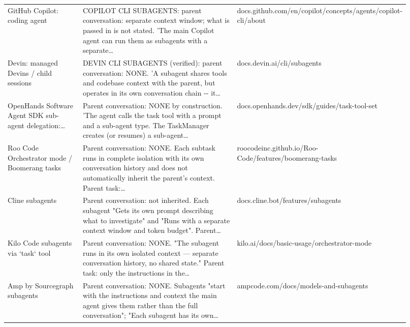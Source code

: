 \begin{longtable}{p{0.22\linewidth}p{0.5\linewidth}p{0.2\linewidth}}
GitHub Copilot: coding agent & COPILOT CLI SUBAGENTS: parent conversation: separate context window; what is passed in is not stated.\allowbreak{} 'The main Copilot agent can run them as subagents with a separate\ldots & docs.\allowbreak{}github.\allowbreak{}com/\allowbreak{}en/\allowbreak{}copilot/\allowbreak{}concepts/\allowbreak{}agents/\allowbreak{}copilot-\allowbreak{}cli/\allowbreak{}about \\
Devin: managed Devins /\allowbreak{} child sessions & DEVIN CLI SUBAGENTS (verified): parent conversation: NONE.\allowbreak{} 'A subagent shares tools and codebase context with the parent, but operates in its own conversation chain -\allowbreak{}-\allowbreak{} it\ldots & docs.\allowbreak{}devin.\allowbreak{}ai/\allowbreak{}cli/\allowbreak{}subagents \\
OpenHands Software Agent SDK sub-\allowbreak{}agent delegation:\ldots & Parent conversation: NONE by construction.\allowbreak{} 'The agent calls the task tool with a prompt and a sub-\allowbreak{}agent type.\allowbreak{} The TaskManager creates (or resumes) a sub-\allowbreak{}agent\ldots & docs.\allowbreak{}openhands.\allowbreak{}dev/\allowbreak{}sdk/\allowbreak{}guides/\allowbreak{}task-\allowbreak{}tool-\allowbreak{}set \\
Roo Code Orchestrator mode /\allowbreak{} Boomerang tasks & Parent conversation: NONE.\allowbreak{} Each subtask runs in complete isolation with its own conversation history and does not automaticall\allowbreak{}y inherit the parent's context.\allowbreak{} Parent task:\ldots & roocodeinc.\allowbreak{}github.\allowbreak{}io/\allowbreak{}Roo-\allowbreak{}Code/\allowbreak{}features/\allowbreak{}boomerang-\allowbreak{}tasks \\
Cline subagents & Parent conversation: not inherited.\allowbreak{} Each subagent "Gets its own prompt describing what to investigate" and "Runs with a separate context window and token budget".\allowbreak{} Parent\ldots & docs.\allowbreak{}cline.\allowbreak{}bot/\allowbreak{}features/\allowbreak{}subagents \\
Kilo Code subagents via `task` tool & Parent conversation: NONE.\allowbreak{} "The subagent runs in its own isolated context — separate conversation history, no shared state.\allowbreak{}" Parent task: only the instructions in the\ldots & kilo.\allowbreak{}ai/\allowbreak{}docs/\allowbreak{}basic-\allowbreak{}usage/\allowbreak{}orchestrator-\allowbreak{}mode \\
Amp by Sourcegraph subagents & Parent conversation: NONE.\allowbreak{} Subagents "start with the instructions and context the main agent gives them rather than the full conversation"; "Each subagent has its own\ldots & ampcode.\allowbreak{}com/\allowbreak{}docs/\allowbreak{}models-\allowbreak{}and-\allowbreak{}subagents \\

\end{longtable}
